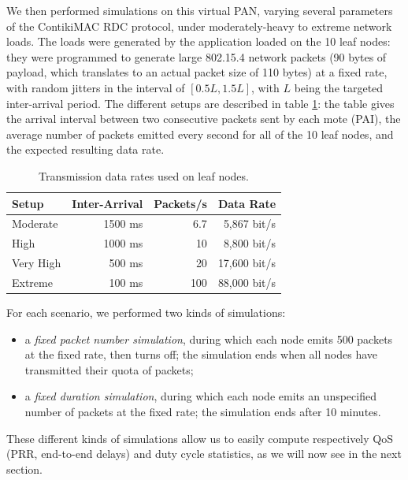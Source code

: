 \documentclass[conference]{IEEEtran}
\begin{document}
We then performed simulations on this virtual PAN, varying several parameters
of the ContikiMAC RDC protocol, under moderately-heavy to extreme network
loads. The loads were generated by the application loaded on the 10 leaf
nodes: they were programmed to generate large 802.15.4 network packets
(90 bytes of payload, which translates to an actual packet size of
110 bytes) at a fixed rate, with random jitters in the interval of
$[ 0.5 L , 1.5  L ]$, with $L$ being the targeted inter-arrival
period. The different setups are described in table \ref{TblDataRates}:
the table gives the arrival interval between two consecutive packets sent
by each mote (PAI), the average number of packets emitted every second
for all of the 10 leaf nodes, and the expected resulting data rate.

\begin{table}[htb]
\centering
\begin{tabular}{|l|r|r|r|}
\hline
Setup     & Inter-Arrival & Packets/s & Data Rate \\
\hline
Moderate  &    1500 ms    &    6.7    &  5,867 bit/s \\ 
High      &    1000 ms    &   10      &  8,800 bit/s \\
Very High &     500 ms    &   20      & 17,600 bit/s \\
Extreme   &     100 ms    &  100      & 88,000 bit/s \\
\hline
\end{tabular}
\caption{Transmission data rates used on leaf nodes.}
\label{TblDataRates}
\end{table}

For each scenario, we performed two kinds of simulations:
\begin{itemize}
\item a \emph{fixed packet number simulation}, during which each node emits
500 packets at the fixed rate, then turns off; the simulation ends when all
nodes have transmitted their quota of packets;

\item a \emph{fixed duration simulation}, during which each node emits an
unspecified number of packets at the fixed rate; the simulation ends after
10 minutes.
\end{itemize}

These different kinds of simulations allow us to easily compute respectively
QoS (PRR, end-to-end delays) and duty cycle statistics, as we will now see
in the next section.


\end{document}

